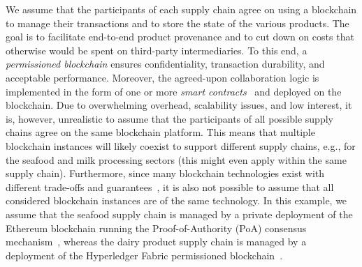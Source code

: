 \documentclass[review]{elsarticle}
\begin{document}
We assume that the participants of each supply chain agree on using a blockchain to manage their transactions and to store the state of the various products.
The goal is to facilitate end-to-end product provenance and to cut down on costs that otherwise would be spent on third-party intermediaries.
To this end, a \emph{permissioned blockchain} ensures confidentiality, transaction durability, and acceptable performance.
Moreover, the agreed-upon collaboration logic is implemented in the form of one or more \emph{smart contracts}~\cite{wood2021ethereum} and deployed on the blockchain.
Due to overwhelming overhead, scalability issues, and low interest, it is, however, unrealistic to assume that the participants of all possible supply chains agree on the same blockchain platform.
This means that multiple blockchain instances will likely coexist to support different supply chains, e.g., for the seafood and milk processing sectors (this might even apply within the same supply chain).
Furthermore, since many blockchain technologies exist with different trade-offs and guarantees~\cite{Falazi2019_TransactionalPropertiesBlockchains}, it is also not possible to assume that all considered blockchain instances are of the same technology.
In this example, we assume that the seafood supply chain is managed by a  private deployment of the Ethereum blockchain running the Proof-of-Authority (PoA) consensus mechanism~\cite{Szilagyi2017Clique}, whereas the dairy product supply chain is managed by a deployment of the Hyperledger Fabric permissioned blockchain~\cite{Androulaki2018Fabric}. 
\end{document}
